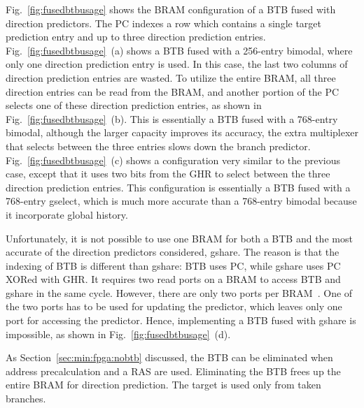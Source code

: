 Fig.~\ref{fig:fusedbtbusage} shows the BRAM configuration of a BTB fused with direction predictors. The PC indexes a row which contains a single target prediction entry and up to three direction prediction entries. Fig.~\ref{fig:fusedbtbusage}~(a) shows a BTB fused with a 256-entry bimodal, where only one direction prediction entry is used. In this case, the last two columns of direction prediction entries are wasted. To utilize the entire BRAM, all three direction entries can be read from the BRAM, and another portion of the PC selects one of these direction prediction entries, as shown in Fig.~\ref{fig:fusedbtbusage}~(b). This is essentially a BTB fused with a 768-entry bimodal, although the larger capacity improves its accuracy, the extra multiplexer that selects between the three entries slows down the branch predictor. Fig.~\ref{fig:fusedbtbusage}~(c) shows a configuration very similar to the previous case, except that it uses two bits from the GHR to select between the three direction prediction entries. This configuration is essentially a BTB fused with a 768-entry gselect, which is much more accurate than a 768-entry bimodal because it incorporate global history. 

Unfortunately, it is not possible to use one BRAM for both a BTB and the most accurate of the direction predictors considered, gshare. The reason is that the indexing of BTB is different than gshare: BTB uses PC, while gshare uses PC XORed with GHR. It requires two read ports on a BRAM to access BTB and gshare in the same cycle. However, there are only two ports per BRAM~\cite{StratixIVM9K}. One of the two ports has to be used for updating the predictor, which leaves only one port for accessing the predictor. Hence, implementing a BTB fused with gshare is impossible, as shown in Fig.~\ref{fig:fusedbtbusage}~(d).


As Section~\ref{sec:min:fpga:nobtb} discussed, the BTB can be eliminated when address precalculation and a RAS are used. Eliminating the BTB frees up the entire BRAM for direction prediction. The target is used only from taken branches. 


